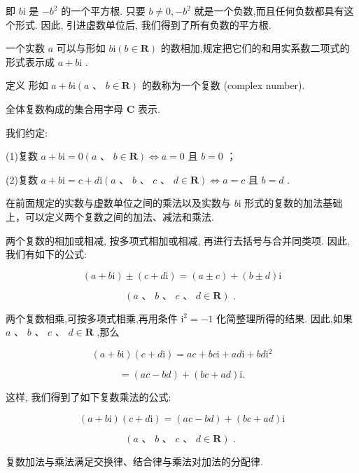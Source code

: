 \documentclass[10pt]{article}
\begin{document}
即 \(b\mathrm{i}\) 是 \(- {b}^{2}\) 的一个平方根. 只要 \(b \neq  0, - {b}^{2}\) 就是一个负数,而且任何负数都具有这个形式. 因此, 引进虚数单位后, 我们得到了所有负数的平方根.

一个实数 \(a\) 可以与形如 \(b\mathrm{i}\left( {b \in  \mathbf{R}}\right)\) 的数相加,规定把它们的和用实系数二项式的形式表示成 \(a + b\mathrm{i}\) .

定义 形如 \(a + b\mathrm{i}\left( {a\text{ 、 }b \in  \mathbf{R}}\right)\) 的数称为一个复数 (complex number).

全体复数构成的集合用字母 \(\mathbf{C}\) 表示.

我们约定:

(1)复数 \(a + b\mathrm{i} = 0\left( {a\text{ 、 }b \in  \mathbf{R}}\right)  \Leftrightarrow  a = 0\) 且 \(b = 0\) ；

(2)复数 \(a + b\mathrm{i} = c + d\mathrm{i}\left( {a\text{ 、 }b\text{ 、 }c\text{ 、 }d \in  \mathbf{R}}\right)  \Leftrightarrow  a = c\) 且 \(b = d\) .

在前面规定的实数与虚数单位之间的乘法以及实数与 \(b\mathrm{i}\) 形式的复数的加法基础上，可以定义两个复数之间的加法、减法和乘法.

两个复数的相加或相减, 按多项式相加或相减, 再进行去括号与合并同类项. 因此, 我们有如下的公式:

\[
\left( {a + b\mathrm{i}}\right)  \pm  \left( {c + d\mathrm{i}}\right)  = \left( {a \pm  c}\right)  + \left( {b \pm  d}\right) \mathrm{i}
\]

\[
\left( {a\text{ 、 }b\text{ 、 }c\text{ 、 }d \in  \mathbf{R}}\right) \text{ . }
\]

两个复数相乘,可按多项式相乘,再用条件 \({\mathrm{i}}^{2} =  - 1\) 化简整理所得的结果. 因此,如果 \(a\text{ 、 }b\text{ 、 }c\text{ 、 }d \in  \mathbf{R}\) ,那么

\[
\left( {a + b\mathrm{i}}\right) \left( {c + d\mathrm{i}}\right)  = {ac} + {bc}\mathrm{i} + {ad}\mathrm{i} + {bd}{\mathrm{i}}^{2}
\]

\[
= \left( {{ac} - {bd}}\right)  + \left( {{bc} + {ad}}\right) \mathrm{i}.
\]

这样, 我们得到了如下复数乘法的公式:

\[
\left( {a + b\mathrm{i}}\right) \left( {c + d\mathrm{i}}\right)  = \left( {{ac} - {bd}}\right)  + \left( {{bc} + {ad}}\right) \mathrm{i}
\]

\[
\left( {a\text{ 、 }b\text{ 、 }c\text{ 、 }d \in  \mathbf{R}}\right) \text{ . }
\]

复数加法与乘法满足交换律、结合律与乘法对加法的分配律.
\end{document}
